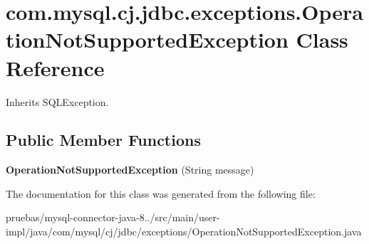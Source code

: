 \hypertarget{classcom_1_1mysql_1_1cj_1_1jdbc_1_1exceptions_1_1_operation_not_supported_exception}{}\section{com.\+mysql.\+cj.\+jdbc.\+exceptions.\+Operation\+Not\+Supported\+Exception Class Reference}
\label{classcom_1_1mysql_1_1cj_1_1jdbc_1_1exceptions_1_1_operation_not_supported_exception}


Inherits S\+Q\+L\+Exception.

\subsection*{Public Member Functions}
\begin{DoxyCompactItemize}
\item 
\mbox{\label{classcom_1_1mysql_1_1cj_1_1jdbc_1_1exceptions_1_1_operation_not_supported_exception_af652fea5842cc87244697e774eb64197}} 
{\bfseries Operation\+Not\+Supported\+Exception} (String message)
\end{DoxyCompactItemize}


The documentation for this class was generated from the following file\+:\begin{DoxyCompactItemize}
\item 
pruebas/mysql-\/connector-\/java-\/8../src/main/user-\/impl/java/com/mysql/cj/jdbc/exceptions/Operation\+Not\+Supported\+Exception.\+java\end{DoxyCompactItemize}

